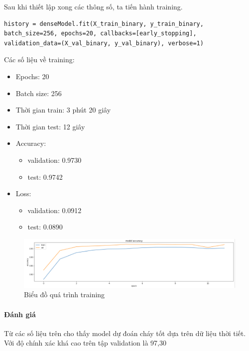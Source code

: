 \documentclass{article}
\begin{document}
Sau khi thiết lập xong các thông số, ta tiến hành training.

\begin{verbatim}
history = denseModel.fit(X_train_binary, y_train_binary, batch_size=256, epochs=20, callbacks=[early_stopping], validation_data=(X_val_binary, y_val_binary), verbose=1)
\end{verbatim}

Các số liệu về training:
\begin{itemize}
	\item Epochs: 20
	\item Batch size: 256
	\item Thời gian train: 3 phút 20 giây
	\item Thời gian test: 12 giây
	\item Accuracy:
	\begin{itemize}
	    \item validation: 0.9730
	    \item test: 0.9742
	\end{itemize}
	\item Loss:
	\begin{itemize}
	    \item validation: 0.0912
	    \item test: 0.0890
	\end{itemize}
\end{itemize}

\begin{figure}[H]
	\centering
	\includegraphics[width=6in]{images/ky1.png}
	\caption{Biểu đồ quá trình training}
\end{figure}

\paragraph{Đánh giá}
Từ các số liệu trên cho thấy model dự đoán cháy tốt dựa trên dữ liệu thời tiết. Với độ chính xác khá cao trên tập validation là 97,30%
\end{document}
